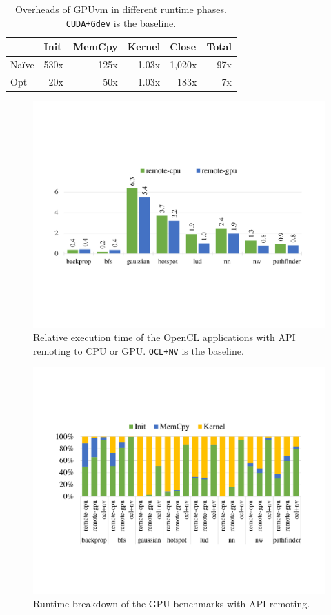 \begin{table}[!ht]
	\centering
	\begin{tabular}{l|r|r|r|r|r|}
		\cline{2-6}
		& \multicolumn{1}{l|}{Init} & \multicolumn{1}{l|}{MemCpy} & \multicolumn{1}{l|}{Kernel} & \multicolumn{1}{l|}{Close} & \multicolumn{1}{l|}{Total} \\ \hline
		\multicolumn{1}{|l|}{Na\"ive} & 530x & 125x & 1.03x & 1,020x & 97x \\ \hline
		\multicolumn{1}{|l|}{Opt} & 20x & 50x & 1.03x & 183x & 7x \\ \hline
	\end{tabular}
	\caption{{\footnotesize Overheads of GPUvm in different runtime phases. \texttt{CUDA+Gdev} is the baseline.}}
	\label{tb_gpuvm_overhead}
\end{table}


\begin{figure}[!ht]
	\centering
	\includegraphics[width=\linewidth,trim={2cm 5.5cm 2.2cm 6cm},clip]{data/api_remote/api_remote_overhead.pdf}
	\caption{{\footnotesize Relative execution time of the OpenCL applications with API remoting to CPU or GPU. \texttt{OCL+NV} is the baseline.}}
	\label{fig_api_remote_overhead} \end{figure}

\begin{figure}[!ht]
	\centering
	\hspace*{-0.25cm}\includegraphics[width=1.1\linewidth,trim={2.2cm 4.8cm 2.1cm 5cm},clip]{data/api_remote/api_remote_breakdown.pdf}
	\caption{{\footnotesize Runtime breakdown of the GPU benchmarks with API remoting.}}
	\label{fig_api_remote_breakdown} \end{figure}